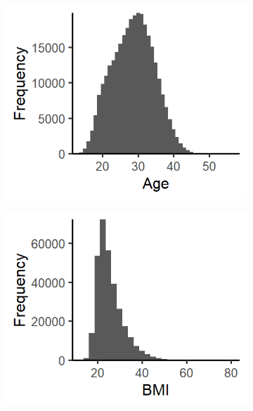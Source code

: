 \documentclass[12pt]{article}
\begin{document}
\begin{figure}[!ht]
    \centering
    \begin{subfigure}{.3\textwidth}
        \includegraphics[width=\textwidth]{supp-img/dens_age.png}
    \vspace{.5cm}
    \end{subfigure}\hfill
    \begin{subfigure}{.3\textwidth}
        \includegraphics[width=\textwidth]{supp-img/dens_bmi.png}
    \vspace{.5cm}
    \end{subfigure}\hfill
    \begin{subfigure}{.3\textwidth}

\end{subfigure}
\end{figure}
\end{document}
